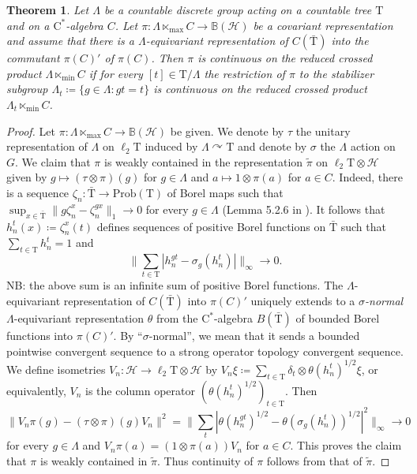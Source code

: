 \documentclass[12pt,nosumlimits,nonamelimits]{amsart}
\newtheorem{thm}{Theorem}
\theoremstyle{remark}
\theoremstyle{definition}
\newcommand{\IB}{\mathbb{B}}
\newcommand{\cH}{\mathcal{H}}
\newcommand{\La}{\Lambda}
\newcommand{\Tree}{\mathrm{T}}
\newcommand{\acts}{\curvearrowright}
\begin{document}
\begin{thm}\label{thm:repn}
Let $\La$ be a countable discrete group acting 
on a countable tree $\Tree$ and 
on a $\mathrm{C}^*$-alge\-bra $C$. 
Let $\pi\colon \La\ltimes_{\max} C\to\IB(\cH)$ be a 
covariant representation 
and assume that there is a $\La$-equivariant 
representation of $C(\bar{\Tree})$ into the commutant 
$\pi(C)'$ of $\pi(C)$. 
Then $\pi$ is continuous on the reduced 
crossed product $\La\ltimes_{\min} C$ 
if for every $[t]\in\Tree/\La$ 
the restriction of $\pi$ to the stabilizer subgroup 
$\La_t \coloneq \{ g\in\La : gt=t\}$ is continuous on 
the reduced crossed product $\La_t\ltimes_{\min} C$. 
\end{thm}
\begin{proof}
Let $\pi\colon \La\ltimes_{\max} C\to\IB(\cH)$ be given. 
We denote by $\tau$ the unitary representation 
of $\La$ on $\ell_2\Tree$ induced by $\La\acts\Tree$
and denote by $\sigma$ the $\Lambda$ action on $G$.  
We claim that $\pi$ is weakly contained in the representation 
$\tilde{\pi}$ on 
$\ell_2\Tree \otimes\cH$ given by 
$g\mapsto (\tau\otimes\pi)(g)$ for $g\in\La$ 
and 
$a\mapsto 1\otimes \pi(a)$ for $a\in C$. 
Indeed, there is a sequence  
$\zeta_n\colon\bar{\Tree}\to\mathrm{Prob}(\Tree)$ 
of Borel maps such that 
$\sup_{x\in\bar{\Tree}}\| g\zeta_n^x - \zeta_n^{gx} \|_1\to0$
for every $g\in\La$ (Lemma 5.2.6 in \cite{bo}). 
It follows that $h_n^t(x) \coloneq \zeta_n^x(t)$ defines sequences 
of positive Borel functions on $\bar{\Tree}$ such that 
$\sum_{t\in\Tree} h_n^t=1$ and 
\[
\| \sum_{t\in\Tree} | h_n^{gt} - \sigma_g(h_n^t) | \|_\infty \to 0.
\]
NB: the above sum is an infinite sum of positive Borel functions. 
The $\La$-equi\-variant representation 
of $C(\bar{\Tree})$ into $\pi(C)'$ uniquely 
extends to a \emph{$\sigma$-normal} $\La$-equi\-variant 
representation $\theta$ from 
the $\mathrm{C}^*$-alge\-bra $B(\bar{\Tree})$ 
of bounded Borel functions into $\pi(C)'$. 
By ``$\sigma$-normal'', 
we mean that it sends a bounded pointwise convergent 
sequence to a strong operator topology convergent sequence. 
We define isometries 
$V_n\colon \cH\to\ell_2\Tree\otimes\cH$ 
by $V_n\xi \coloneq \sum_{t\in\Tree} \delta_t \otimes \theta(h_n^t)^{1/2}\xi$, 
or equivalently, $V_n$ is the column operator $(\theta(h_n^t)^{1/2})_{t\in\Tree}$.
Then 
\[
\|V_n \pi(g) - (\tau\otimes\pi)(g)V_n\|^2 
=\| \sum_t |\theta(h_n^{gt})^{1/2}-\theta(\sigma_g(h_n^t))^{1/2}|^2 \|_\infty \to 0
\]
for every $g\in\La$ 
and $V_n\pi(a) = (1\otimes\pi(a))V_n$ for $a\in C$. 
This proves the claim that $\pi$ is weakly contained in $\tilde{\pi}$. 
Thus continuity of $\pi$ follows from that of $\tilde{\pi}$. 


\end{proof}
\end{document}
